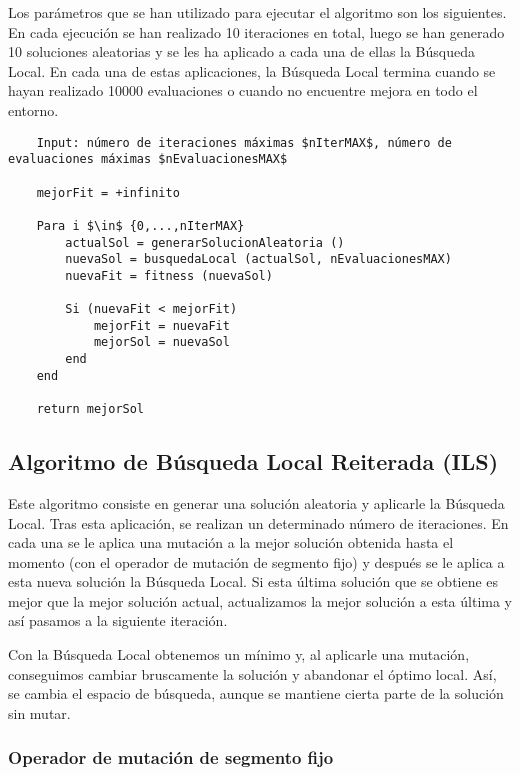 	Los parámetros que se han utilizado para ejecutar el algoritmo son los siguientes.
	En cada ejecución se han realizado 10 iteraciones en total, luego se han generado 10
	soluciones aleatorias y se les ha aplicado a cada una de ellas la Búsqueda Local. 
	En cada una de estas aplicaciones, la Búsqueda Local termina cuando se hayan realizado 
	10000 evaluaciones o cuando no encuentre mejora en todo el entorno.

	\footnotesize
	\begin{lstlisting}
	Input: número de iteraciones máximas $nIterMAX$, número de evaluaciones máximas $nEvaluacionesMAX$

	mejorFit = +infinito

	Para i $\in$ {0,...,nIterMAX}
		actualSol = generarSolucionAleatoria ()
		nuevaSol = busquedaLocal (actualSol, nEvaluacionesMAX)
		nuevaFit = fitness (nuevaSol)

		Si (nuevaFit < mejorFit)
			mejorFit = nuevaFit 
			mejorSol = nuevaSol 
		end 
	end 
		
	return mejorSol 
	\end{lstlisting}
	\normalsize

	\subsection{Algoritmo de Búsqueda Local Reiterada (ILS)}
	
	Este algoritmo consiste en generar una solución aleatoria y aplicarle la Búsqueda Local.
	Tras esta aplicación, se realizan un determinado número de iteraciones. En cada una se le aplica una mutación a
	la mejor solución obtenida hasta el momento (con el operador de mutación de segmento fijo) y después se le aplica 
	a esta nueva solución la Búsqueda Local. Si esta última solución que se obtiene es mejor que la mejor solución actual, 
	actualizamos la mejor solución a esta última y así pasamos a la siguiente iteración.

	Con la Búsqueda Local obtenemos un mínimo y, al aplicarle una mutación, conseguimos cambiar bruscamente la solución y abandonar el óptimo local.
	Así, se cambia el espacio de búsqueda, aunque se mantiene cierta parte de la solución sin mutar.

	\subsubsection{Operador de mutación de segmento fijo}

